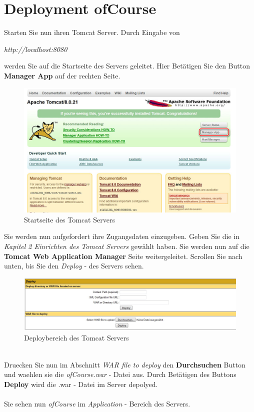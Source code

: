 \documentclass[a4paper, 12pt]{scrreprt}
\begin{document}
\chapter{Deployment ofCourse}
Starten Sie nun ihren Tomcat Server. Durch Eingabe von
\begin{center}
		{\it http://localhost:8080}
\end{center}
werden Sie auf die Startseite des Servers geleitet. Hier Betätigen Sie den Button \textbf{Manager App} auf der rechten Seite.
\begin{figure}[h]
\centering
\includegraphics[width=0.8\linewidth]{Grafiken/ServerStartPage}
\caption{Startseite des Tomcat Servers}
\label{fig:ServerStartPage}
\end{figure}
Sie werden nun aufgefordert ihre Zugangsdaten einzugeben. Geben Sie die in {\it Kapitel 2 Einrichten des Tomcat Servers} gewählt haben. Sie werden nun auf die \textbf{Tomcat Web Application Manager} Seite weitergeleitet.
Scrollen Sie nach unten, bis Sie den {\it Deploy} - des Servers sehen.
\begin{figure}[h]
\centering
\includegraphics[width=0.7\linewidth]{Grafiken/ServerDeploy}
\caption{Deploybereich des Tomcat Servers}
\label{fig:ServerDeploy}
\end{figure}
\\
Druecken Sie nun im Abschnitt {\it WAR file to deploy} den \textbf{Durchsuchen} Button und waehlen sie die {\it ofCourse.war} - Datei aus. Durch Betätigen des Buttons \textbf{Deploy} wird die .war - Datei im Server depolyed.\\
\ \\
Sie sehen nun {\it ofCourse} im {\it Application} - Bereich des Servers.
\end{document}
